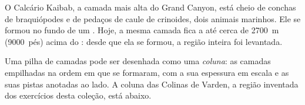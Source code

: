 \begin{example}\label{ex:g7:sediments-and-fossils:kaibab}
O Calcário Kaibab, a camada mais alta do Grand Canyon, está cheio de
conchas de braquiópodes e de pedaços de caule de crinoides, dois animais
marinhos. Ele se formou no fundo de um . Hoje, a mesma camada fica a
até cerca de \qty{2700}{m} (\num{9000}~pés) acima do : desde
que ela se formou, a região inteira foi levantada.
\end{example}

Uma pilha de camadas pode ser desenhada como uma \emph{coluna}: as camadas
empilhadas na ordem em que se formaram, com a sua espessura em escala e as
suas pistas anotadas ao lado. A coluna das Colinas de Varden, a região
inventada dos exercícios desta coleção, está abaixo.

